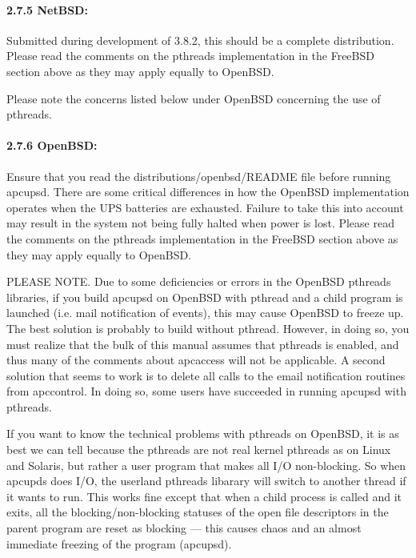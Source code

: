\paragraph*{2.7.5 NetBSD:}

\label{index-NetBSD-40}
\label{index-OS_002c-NetBSD-41}
Submitted during development of 3.8.2, this should be a complete distribution.
Please read the comments on the pthreads implementation in the FreeBSD
section above as they may apply equally to OpenBSD.  

Please note the concerns listed below under OpenBSD concerning the use of
pthreads. 

\label{OpenBSD}

\paragraph*{2.7.6 OpenBSD:}

\label{index-OpenBSD-42}
\label{index-OS_002c-OpenBSD-43}
Ensure that you read the distributions/openbsd/README file before running
apcupsd. There are some critical differences in how the OpenBSD implementation
operates when the UPS batteries are exhausted. Failure to take this into
account may result in the system not being fully halted when power is lost. 
Please read the comments on the pthreads implementation in the FreeBSD section
above as they may apply equally to OpenBSD.  

PLEASE NOTE. Due to some deficiencies or errors in the OpenBSD pthreads
libraries, if you build apcupsd on OpenBSD with pthread and a child program is
launched (i.e. mail notification of events), this may cause OpenBSD to freeze
up. The best solution is probably to build without pthread. However, in doing
so, you must realize that the bulk of this manual assumes that pthreads is
enabled, and thus many of the comments about apcaccess will not be applicable.
A second solution that seems to work is to delete all calls to the email
notification routines from apccontrol. In doing so, some users have succeeded
in running apcupsd with pthreads.  

If you want to know the technical problems with pthreads on OpenBSD, it is as
best we can tell because the pthreads are not real kernel pthreads as on Linux
and Solaris, but rather a user program that makes all I/O non-blocking. So
when apcupds does I/O, the userland pthreads libarary will switch to another
thread if it wants to run. This works fine except that when a child process is
called and it exits, all the blocking/non-blocking statuses of the open file
descriptors in the parent program are reset as blocking {---} this causes
chaos and an almost immediate freezing of the program (apcupsd). 

